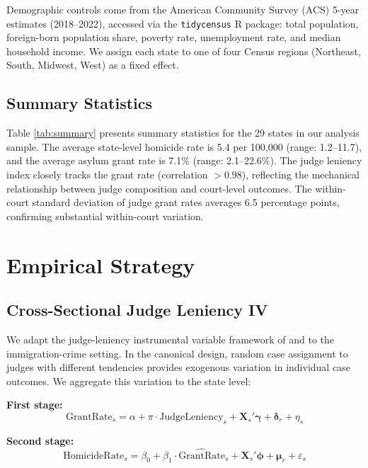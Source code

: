 \documentclass[12pt]{article}
\begin{document}
Demographic controls come from the American Community Survey (ACS) 5-year estimates (2018--2022), accessed via the \texttt{tidycensus} R package: total population, foreign-born population share, poverty rate, unemployment rate, and median household income. We assign each state to one of four Census regions (Northeast, South, Midwest, West) as a fixed effect.

\subsection{Summary Statistics}



Table \ref{tab:summary} presents summary statistics for the 29 states in our analysis sample. The average state-level homicide rate is 5.4 per 100,000 (range: 1.2--11.7), and the average asylum grant rate is 7.1\% (range: 2.1--22.6\%). The judge leniency index closely tracks the grant rate (correlation $> 0.98$), reflecting the mechanical relationship between judge composition and court-level outcomes. The within-court standard deviation of judge grant rates averages 6.5 percentage points, confirming substantial within-court variation.


\section{Empirical Strategy}

\subsection{Cross-Sectional Judge Leniency IV}

We adapt the judge-leniency instrumental variable framework of \citet{kling2006} and \citet{dobbie2018} to the immigration-crime setting. In the canonical design, random case assignment to judges with different tendencies provides exogenous variation in individual case outcomes. We aggregate this variation to the state level:

\textbf{First stage:}
\begin{equation}
\text{GrantRate}_s = \alpha + \pi \cdot \text{JudgeLeniency}_s + \mathbf{X}_s'\boldsymbol{\gamma} + \boldsymbol{\delta}_r + \eta_s
\label{eq:first_stage}
\end{equation}

\textbf{Second stage:}
\begin{equation}
\text{HomicideRate}_s = \beta_0 + \beta_1 \cdot \widehat{\text{GrantRate}}_s + \mathbf{X}_s'\boldsymbol{\phi} + \boldsymbol{\mu}_r + \varepsilon_s
\label{eq:second_stage}
\end{equation}
\end{document}
